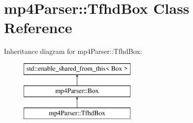 \hypertarget{classmp4_parser_1_1_tfhd_box}{}\section{mp4\+Parser\+::Tfhd\+Box Class Reference}
\label{classmp4_parser_1_1_tfhd_box}
Inheritance diagram for mp4\+Parser\+::Tfhd\+Box\+:\begin{figure}[H]
\begin{center}
\leavevmode
\includegraphics[height=3.000000cm]{classmp4_parser_1_1_tfhd_box}
\end{center}
\end{figure}
